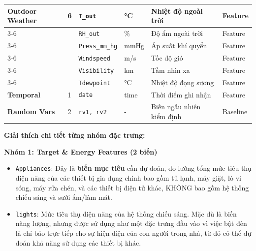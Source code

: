 \begin{table}[H]
\begin{tabular}{|
        p{2.5cm}|
        p{1.4cm}|
        p{2.3cm}|
        p{1.2cm}|
        p{4.5cm}|
        p{1.8cm}|
    }
        \multirow{6}{2.5cm}{\textbf{Outdoor Weather}} 
        & \multirow{6}{1.4cm}{6} 
        & \texttt{T\_out} & °C & Nhiệt độ ngoài trời & Feature \\
        \cline{3-6}
        & & \texttt{RH\_out} & \% & Độ ẩm ngoài trời & Feature \\
        \cline{3-6}
        & & \texttt{Press\_mm\_hg} & mmHg & Áp suất khí quyển & Feature \\
        \cline{3-6}
        & & \texttt{Windspeed} & m/s & Tốc độ gió & Feature \\
        \cline{3-6}
        & & \texttt{Visibility} & km & Tầm nhìn xa & Feature \\
        \cline{3-6}
        & & \texttt{Tdewpoint} & °C & Nhiệt độ đọng sương & Feature \\
        \hline

        \textbf{Temporal} & 1 & \texttt{date} & time & Thời điểm ghi nhận & Feature \\
        \hline

        \textbf{Random Vars} & 2 & \texttt{rv1, rv2} & - & Biến ngẫu nhiên kiểm định & Baseline \\
        \hline

    \end{tabular}
\end{table}

\noindent\textbf{Giải thích chi tiết từng nhóm đặc trưng:}

\textbf{Nhóm 1: Target \& Energy Features (2 biến)}
\begin{itemize} [labelsep=10pt, leftmargin=2cm]
    \item \texttt{Appliances}: Đây là \textbf{biến mục tiêu} cần dự đoán, đo lường tổng mức tiêu thụ điện năng của các thiết bị gia dụng chính bao gồm tủ lạnh, máy giặt, lò vi sóng, máy rửa chén, và các thiết bị điện tử khác, KHÔNG bao gồm hệ thống chiếu sáng và sưởi ấm/làm mát.
    \item \texttt{lights}: Mức tiêu thụ điện năng của hệ thống chiếu sáng. Mặc dù là biến năng lượng, nhưng được sử dụng như một đặc trưng đầu vào vì việc bật đèn là chỉ báo trực tiếp cho sự hiện diện của con người trong nhà, từ đó có thể dự đoán khả năng sử dụng các thiết bị khác.
\end{itemize}

